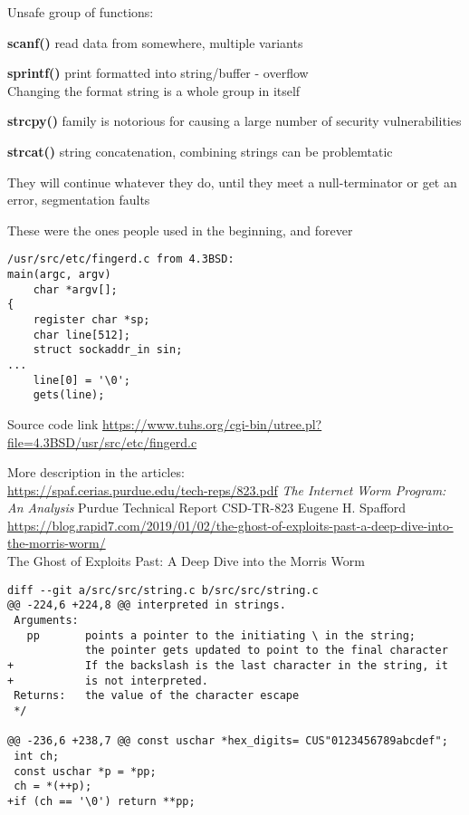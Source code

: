 \documentclass[Screen16to9,17pt]{foils}
\begin{document}

 Unsafe group of functions:
\begin{list2}
\item {\bf scanf()} read data from somewhere, multiple variants
\item {\bf sprintf()} print formatted into string/buffer - overflow\\
Changing the format string is a whole group in itself
\item {\bf strcpy()} family is notorious for causing a large number of security vulnerabilities
\item {\bf strcat()} string concatenation, combining strings can be problemtatic
\end{list2}

They will continue whatever they do, until they meet a null-terminator or get an error, segmentation faults
\vskip 1cm
\centerline{These were the ones people used in the beginning, and forever}


\begin{verbatim}
/usr/src/etc/fingerd.c from 4.3BSD:
main(argc, argv)
	char *argv[];
{
	register char *sp;
	char line[512];
	struct sockaddr_in sin;
...
	line[0] = '\0';
	gets(line);
\end{verbatim}

Source code link \url{https://www.tuhs.org/cgi-bin/utree.pl?file=4.3BSD/usr/src/etc/fingerd.c}

More description in the articles:\\
{\footnotesize\url{https://spaf.cerias.purdue.edu/tech-reps/823.pdf}} \emph{The Internet Worm Program: An Analysis}
Purdue Technical Report CSD-TR-823
Eugene H. Spafford\\ {\footnotesize\url{https://blog.rapid7.com/2019/01/02/the-ghost-of-exploits-past-a-deep-dive-into-the-morris-worm/}}\\ The Ghost of Exploits Past: A Deep Dive into the Morris Worm



\begin{verbatim}
diff --git a/src/src/string.c b/src/src/string.c
@@ -224,6 +224,8 @@ interpreted in strings.
 Arguments:
   pp       points a pointer to the initiating \ in the string;
            the pointer gets updated to point to the final character
+           If the backslash is the last character in the string, it
+           is not interpreted.
 Returns:   the value of the character escape
 */

@@ -236,6 +238,7 @@ const uschar *hex_digits= CUS"0123456789abcdef";
 int ch;
 const uschar *p = *pp;
 ch = *(++p);
+if (ch == '\0') return **pp;
\end{verbatim}
\end{document}
